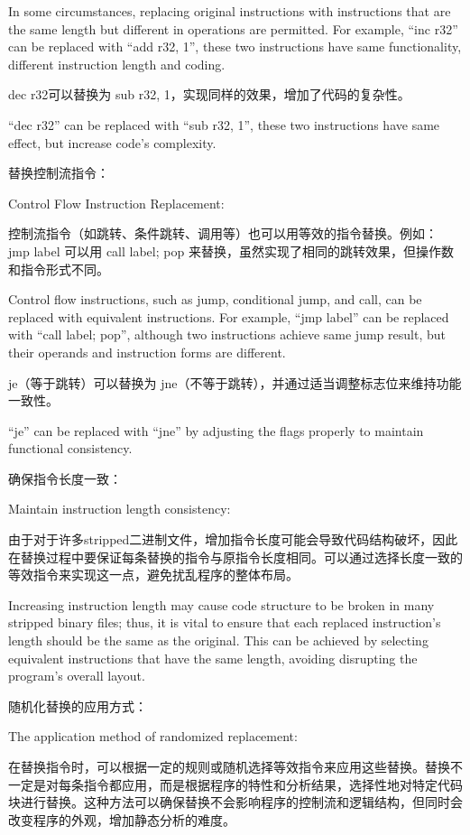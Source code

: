 In some circumstances, replacing original instructions with instructions that are the same length but different in operations are permitted.
For example, “inc r32” can be replaced with “add r32, 1”, these two instructions have same functionality, different instruction length and coding.

dec r32可以替换为 sub r32, 1，实现同样的效果，增加了代码的复杂性。

“dec r32” can be replaced with “sub r32, 1”, these two instructions have same effect, but increase code's complexity.

替换控制流指令：

Control Flow Instruction Replacement:

控制流指令（如跳转、条件跳转、调用等）也可以用等效的指令替换。例如：
jmp label 可以用 call label; pop 来替换，虽然实现了相同的跳转效果，但操作数和指令形式不同。

Control flow instructions, such as jump, conditional jump, and call, can be replaced with equivalent instructions. For example, “jmp label” can be replaced with “call label; pop”, although two instructions achieve same jump result, but their operands and instruction forms are different.

je（等于跳转）可以替换为 jne（不等于跳转），并通过适当调整标志位来维持功能一致性。

“je” can be replaced with “jne” by adjusting the flags properly to maintain functional consistency.

确保指令长度一致：

Maintain instruction length consistency:

由于对于许多stripped二进制文件，增加指令长度可能会导致代码结构破坏，因此在替换过程中要保证每条替换的指令与原指令长度相同。可以通过选择长度一致的等效指令来实现这一点，避免扰乱程序的整体布局。

Increasing instruction length may cause code structure to be broken in many stripped binary files; thus, it is vital to ensure that each replaced instruction's length should be the same as the original. This can be achieved by selecting equivalent instructions that have the same length, avoiding disrupting the program's overall layout.

随机化替换的应用方式：

The application method of randomized replacement:

在替换指令时，可以根据一定的规则或随机选择等效指令来应用这些替换。替换不一定是对每条指令都应用，而是根据程序的特性和分析结果，选择性地对特定代码块进行替换。这种方法可以确保替换不会影响程序的控制流和逻辑结构，但同时会改变程序的外观，增加静态分析的难度。

